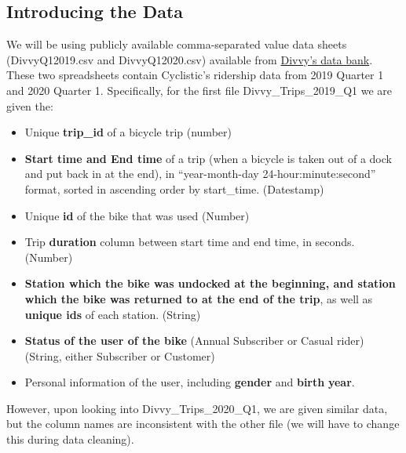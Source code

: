 \documentclass[
]{article}
\begin{document}
\subsection{\texorpdfstring{\textbf{Introducing the
Data}}{Introducing the Data}}\label{introducing-the-data}

We will be using publicly available comma-separated value data sheets
(DivvyQ12019.csv and DivvyQ12020.csv) available from
\href{https://divvybikes.com/system-data}{Divvy's data bank}. These two
spreadsheets contain Cyclistic's ridership data from 2019 Quarter 1 and
2020 Quarter 1. Specifically, for the first file Divvy\_Trips\_2019\_Q1
we are given the:

\begin{itemize}
\item
  Unique \textbf{trip\_id} of a bicycle trip (number)
\item
  \textbf{Start time and End time} of a trip (when a bicycle is taken
  out of a dock and put back in at the end), in ``year-month-day
  24-hour:minute:second'' format, sorted in ascending order by
  start\_time. (Datestamp)
\item
  Unique \textbf{id} of the bike that was used (Number)
\item
  Trip \textbf{duration} column between start time and end time, in
  seconds. (Number)
\item
  \textbf{Station which the bike was undocked at the beginning, and
  station which the bike was returned to at the end of the trip}, as
  well as \textbf{unique ids} of each station. (String)
\item
  \textbf{Status of the user of the bike} (Annual Subscriber or Casual
  rider) (String, either Subscriber or Customer)
\item
  Personal information of the user, including \textbf{gender} and
  \textbf{birth} \textbf{year}.
\end{itemize}

However, upon looking into Divvy\_Trips\_2020\_Q1, we are given similar
data, but the column names are inconsistent with the other file (we will
have to change this during data cleaning).
\end{document}
